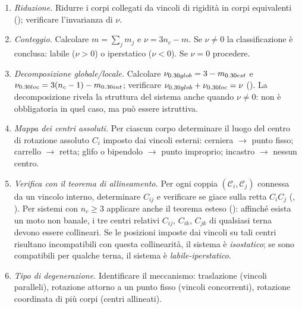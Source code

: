 \begin{enumerate}[label=(\arabic*), leftmargin=*, itemsep=4pt]
	
	\item \emph{Riduzione.}
	Ridurre i corpi collegati da vincoli di rigidità in
	corpi equivalenti ();
	verificare l'invarianza di $\nu$.
	
	\item \emph{Conteggio.}
	Calcolare $m = \sum_j m_j$ e $\nu = 3n_c - m$.
	Se $\nu \neq 0$ la classificazione è conclusa:
	labile ($\nu > 0$) o iperstatico ($\nu < 0$).
	Se $\nu = 0$ procedere.
	
	\item \emph{Decomposizione globale/locale.}
	Calcolare $\nu_{\rm glob} = 3 - m_{\rm est}$
	e $\nu_{\rm loc} = 3(n_c-1) - m_{\rm int}$;
	verificare $\nu_{\rm glob} + \nu_{\rm loc} = \nu$
	().
	La decomposizione rivela la struttura del sistema
	anche quando $\nu \neq 0$: non è obbligatoria in quel caso,
	ma può essere istruttiva.
	
	\item \emph{Mappa dei centri assoluti.}
	Per ciascun corpo determinare il luogo del centro
	di rotazione assoluto $C_i$ imposto dai vincoli
	esterni: cerniera $\to$ punto fisso; carrello $\to$
	retta; glifo o bipendolo $\to$ punto improprio;
	incastro $\to$ nessun centro.
	
	\item \emph{Verifica con il teorema di allineamento.}
	Per ogni coppia $(\mathcal{C}_i, \mathcal{C}_j)$
	connessa da un vincolo interno, determinare $C_{ij}$
	e verificare se giace sulla retta $C_i C_j$
	(,
	). Per sistemi con
	$n_c \geq 3$ applicare anche il teorema esteso
	(): affinché
	esista un moto non banale, i tre centri relativi
	$C_{ij}$, $C_{ik}$, $C_{jk}$ di qualsiasi terna
	devono essere collineari. Se le posizioni imposte
	dai vincoli su tali centri risultano incompatibili
	con questa collinearità, il sistema è
	\textit{isostatico}; se sono compatibili per
	qualche terna, il sistema è
	\textit{labile-iperstatico}.
	
	\item \emph{Tipo di degenerazione.}
	Identificare il meccanismo: traslazione (vincoli
	paralleli), rotazione attorno a un punto fisso
	(vincoli concorrenti), rotazione coordinata di più
	corpi (centri allineati).
	
\end{enumerate}

